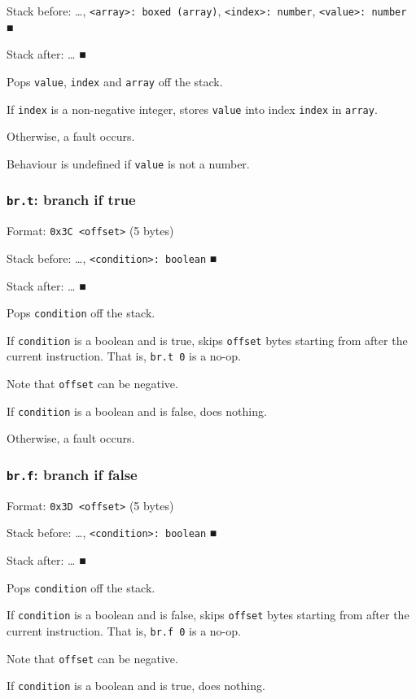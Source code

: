 Stack before: \ldots{}​, \texttt{<array>: boxed (array)}, \texttt{<index>: number},
\texttt{<value>: number} ■

Stack after: \ldots{}​ ■

Pops \texttt{value}, \texttt{index} and \texttt{array} off the stack.

If \texttt{index} is a non-negative integer, stores \texttt{value} into index \texttt{index}
in \texttt{array}.

Otherwise, a fault occurs.

Behaviour is undefined if \texttt{value} is not a number.

\subsubsection{\texttt{br.t}: branch if true}
\label{sec:orge20199f}
Format: \texttt{0x3C <offset>} (5 bytes)

Stack before: \ldots{}​, \texttt{<condition>: boolean} ■

Stack after: \ldots{}​ ■

Pops \texttt{condition} off the stack.

If \texttt{condition} is a boolean and is true, skips \texttt{offset} bytes starting
from after the current instruction. That is, \texttt{br.t 0} is a no-op.

Note that \texttt{offset} can be negative.

If \texttt{condition} is a boolean and is false, does nothing.

Otherwise, a fault occurs.

\subsubsection{\texttt{br.f}: branch if false}
\label{sec:org6c72b12}
Format: \texttt{0x3D <offset>} (5 bytes)

Stack before: \ldots{}​, \texttt{<condition>: boolean} ■

Stack after: \ldots{}​ ■

Pops \texttt{condition} off the stack.

If \texttt{condition} is a boolean and is false, skips \texttt{offset} bytes starting
from after the current instruction. That is, \texttt{br.f 0} is a no-op.

Note that \texttt{offset} can be negative.

If \texttt{condition} is a boolean and is true, does nothing.

